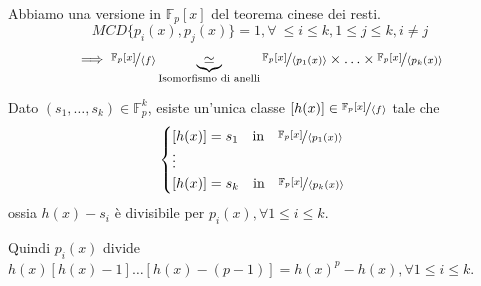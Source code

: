 \documentclass[../main.tex]{subfiles}
\begin{document}
Abbiamo una versione in $\mathbb{F}_p[x]$ del teorema cinese dei resti.
\begin{equation*}
    MCD\{ p_i(x), p_j(x)\} = 1, \forall \ \leq i \leq k, 1 \leq j \leq k, i \neq j
\end{equation*}
\begin{align*}
    \implies \nicefrac{\mathbb{F}_p[x]}{\langle f\rangle} \underbrace{\simeq}_{\text{Isomorfismo di anelli}} \nicefrac{\mathbb{F}_p[x]}{\langle p_1(x)\rangle} \times \ldots \times \nicefrac{\mathbb{F}_p[x]}{\langle p_k(x)\rangle}
\end{align*}

Dato $(s_1, \ldots, s_k) \in \mathbb{F}_p^k$, esiste un'unica classe $[h(x)] \in \nicefrac{\mathbb{F}_p[x]}{\langle f \rangle}$ tale che
\begin{equation*}
    \begin{cases}
        [h(x)] = s_1 \quad \text{in} \quad \nicefrac{\mathbb{F}_p[x]}{\langle p_1(x)\rangle} \\
        \vdots                                                                               \\
        [h(x)] = s_k \quad \text{in} \quad \nicefrac{\mathbb{F}_p[x]}{\langle p_k(x)\rangle}
    \end{cases}
\end{equation*}
ossia $h(x) - s_i$ è divisibile per $p_i(x), \forall 1 \leq i \leq k$.

Quindi $p_i(x)$ divide $h(x)[h(x) - 1] \ldots [h(x) - (p - 1)] = h(x)^p - h(x), \forall 1 \leq i \leq k$.
\end{document}
